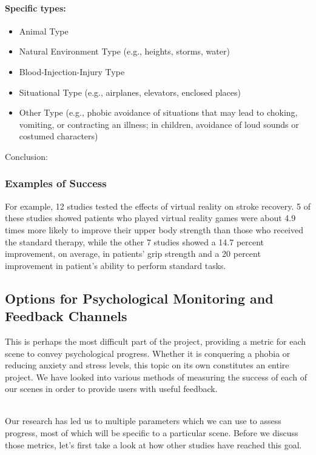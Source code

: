 \documentclass[a4paper,10pt]{article}
\begin{document}
\paragraph{Specific types:} 
\begin{itemize}
\item Animal Type
\item Natural Environment Type (e.g., heights, storms, water) 
\item Blood-Injection-Injury Type 
\item Situational Type (e.g., airplanes, elevators, enclosed places) 
\item Other Type (e.g., phobic avoidance of situations that may lead to choking, vomiting, or contracting an illness; in children, avoidance of loud sounds or costumed characters)
\end{itemize}
\par

Conclusion:

\pagebreak
\subsubsection{Examples of Success}
For example, 12 studies tested the effects of virtual reality on stroke recovery. 5 of these studies showed patients who played virtual reality games were about 4.9 times more likely to improve their upper body strength than those who received the standard therapy, while the other 7  studies showed a 14.7 percent improvement, on average, in patients' grip strength and a 20 percent improvement in patient's ability to perform standard tasks.\cite{stroke1}

\pagebreak
\subsection{Options for Psychological Monitoring and Feedback Channels}
This is perhaps the most difficult part of the project, providing a metric for each scene to convey psychological progress. Whether it is conquering a phobia or reducing anxiety and stress levels, this topic on its own constitutes an entire project. We have looked into various methods of measuring the success of each of our scenes in order to provide users with useful feedback.

\par~\\ 
Our research has led us to multiple parameters which we can use to assess progress, most of which will be specific to a particular scene. Before we discuss those metrics, let's first take a look at how other studies have reached this goal.
\end{document}
